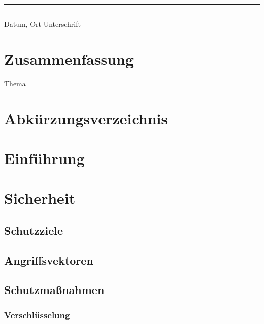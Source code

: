\documentclass[12pt,a4paper,parskip=half]{scrreprt}
\begin{document}
\vfill
\noindent\rule{5cm}{.4pt}\hfill\rule{5cm}{.4pt}\par
\noindent Datum, Ort \hfill Unterschrift 

\newpage
\thispagestyle{empty}
\chapter*{Zusammenfassung}

Thema
\\
\bigskip

\tableofcontents
{}

\listoffigures
{} 

\newpage
\chapter*{Abkürzungsverzeichnis}
\begin{acronym}[HTTP]
\end{acronym}


\chapter{Einführung}


\chapter{Sicherheit}


\section{Schutzziele}


\section{Angriffsvektoren}


\section{Schutzmaßnahmen}


\subsection{Verschlüsselung}
\end{document}
